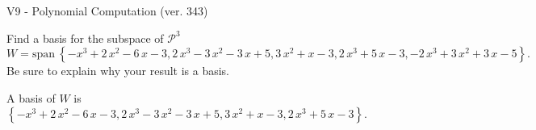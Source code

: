 \begin{exercise}
  \begin{exerciseTitle}V9 - Polynomial Computation (ver. 343)\end{exerciseTitle}
  \begin{exerciseStatement}
    Find a basis for the subspace of \(\mathcal{P}^3\) 
\[W=\mathrm{span}\ \left\{-x^{3} + 2 \, x^{2} - 6 \, x - 3 , 2 \, x^{3} - 3 \, x^{2} - 3 \, x + 5 , 3 \, x^{2} + x - 3 , 2 \, x^{3} + 5 \, x - 3 , -2 \, x^{3} + 3 \, x^{2} + 3 \, x - 5\right\}.\]
 Be sure to explain why your result is a basis.


  \end{exerciseStatement}
  \begin{exerciseAnswer}
   A basis of \(W\) is  \(\left\{-x^{3} + 2 \, x^{2} - 6 \, x - 3 , 2 \, x^{3} - 3 \, x^{2} - 3 \, x + 5 , 3 \, x^{2} + x - 3 , 2 \, x^{3} + 5 \, x - 3\right\}\).
  


  \end{exerciseAnswer}
\end{exercise}